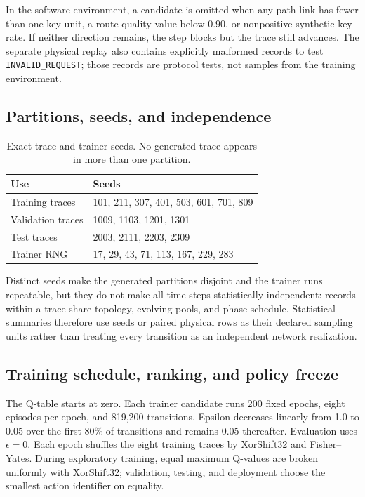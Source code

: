 In the software environment, a candidate is omitted when any path link has fewer
than one key unit, a route-quality value below 0.90, or nonpositive synthetic key
rate. If neither direction remains, the step blocks but the trace still advances.
The separate physical replay also contains explicitly malformed records to test
\texttt{INVALID\_REQUEST}; those records are protocol tests, not samples from the
training environment.

\subsection{Partitions, seeds, and independence}

\begin{table}[H]
\centering
\small
\caption{Exact trace and trainer seeds. No generated trace appears in more than one
partition.}
\label{tab:training-seeds}
\begin{tabularx}{\textwidth}{@{}p{}X@{}}
\toprule
\textbf{Use} & \textbf{Seeds}\\
\midrule
Training traces & 101, 211, 307, 401, 503, 601, 701, 809\\
Validation traces & 1009, 1103, 1201, 1301\\
Test traces & 2003, 2111, 2203, 2309\\
Trainer RNG & 17, 29, 43, 71, 113, 167, 229, 283\\
\bottomrule
\end{tabularx}
\end{table}

Distinct seeds make the generated partitions disjoint and the trainer runs
repeatable, but they do not make all time steps statistically independent: records
within a trace share topology, evolving pools, and phase schedule. Statistical
summaries therefore use seeds or paired physical rows as their declared sampling
units rather than treating every transition as an independent network realization.

\subsection{Training schedule, ranking, and policy freeze}

The Q-table starts at zero. Each trainer candidate runs 200 fixed epochs, eight
episodes per epoch, and 819,200 transitions. Epsilon decreases linearly from 1.0 to
0.05 over the first 80\% of transitions and remains 0.05 thereafter. Evaluation
uses $\epsilon=0$. Each epoch shuffles the eight training traces by XorShift32 and
Fisher--Yates. During exploratory training, equal maximum Q-values are broken
uniformly with XorShift32; validation, testing, and deployment choose the smallest
action identifier on equality.

